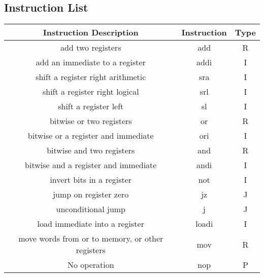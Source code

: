 \documentclass[a4paper]{article}
\begin{document}
\subsection{Instruction List}

\begin{center}
\begin{tabular}{|c | c | c |}
\hline
Instruction Description & Instruction & Type\\ \hline
add two registers& 					add & R\\ \hline
add an immediate to a register& 	addi& I\\ \hline
shift a register right arithmetic& 	sra & I\\ \hline
shift a register right logical&		srl & I\\ \hline
shift a register left&				sl  & I\\ \hline
bitwise or two registers&			or  & R\\ \hline
bitwise or a register and immediate&ori & I\\ \hline
bitwise and two registers&			and & R\\ \hline
bitwise and a register and immediate&andi&I\\ \hline
invert bits in a register&			not& I\\ \hline
jump on register zero&				jz 	& J\\ \hline
unconditional jump&					j	& J\\ \hline
load immediate into a register&		loadi&I\\ \hline
move words from or to memory, or other registers&mov&R\\ \hline
No operation&						nop	& P\\ \hline

\end{tabular}
\end{center}
\end{document}
